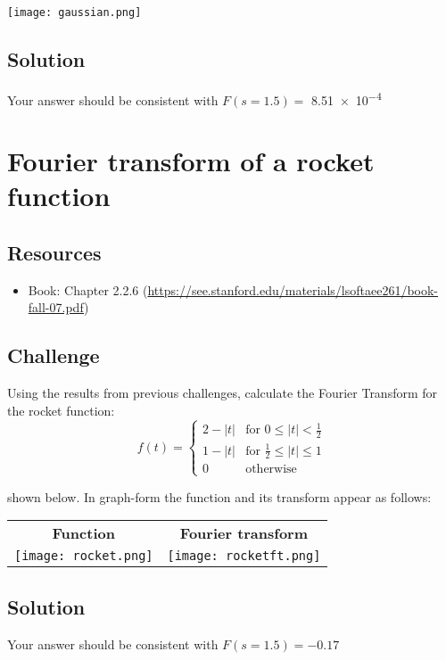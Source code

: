 \texttt{[image: gaussian.png]}

\subsection*{Solution}
Your answer should be consistent with $F(s=1.5) =$ \num{8.51e-4}




\newpage
\section{Fourier transform of a rocket function}

\subsection*{Resources}
\begin{itemize}
    \item Book: Chapter 2.2.6 (\url{https://see.stanford.edu/materials/lsoftaee261/book-fall-07.pdf})
\end{itemize}

\subsection*{Challenge}
Using the results from previous challenges, calculate the Fourier Transform for the rocket function:
\begin{equation}
    f(t)=
    \begin{cases}
        2 - |t| & \text{for } 0 \le |t| < \frac{1}{2}\\
        1 - |t| & \text{for } \frac{1}{2} \le |t| \le 1\\
        0 & \text{otherwise}
    \end{cases}
\end{equation}
    
shown below. In graph-form the function and its transform appear as follows:

\begin{tabular}{cc}
    \textbf{Function} & \textbf{Fourier transform} \\
    \texttt{[image: rocket.png]} & \texttt{[image: rocketft.png]}
\end{tabular}

\subsection*{Solution}
Your answer should be consistent with $F(s=1.5) = -0.17$




